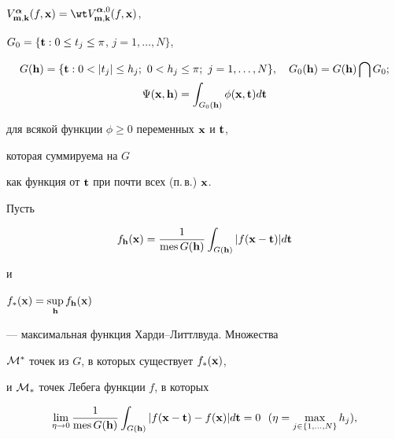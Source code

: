 $V_{{\bold m},{\bold k}}^{\boldsymbol{\alpha}}(f,{\bold x})


=\wt V_{{\bold m},{\bold k}}^{{\boldsymbol{\alpha}},0}(f,{\bold x})$,


$G_0=\{{\bold t}: 0\le t_j\le \pi$, $j=1,\dotsc,N\}$,


\begin{gather*}


G({\bold h})=\{{\bold t}: 0< |t_j|\le h_j;\ 0<h_j\le \pi;\ j=1,\dotsc,N\},


\quad G_{0}({\bold h})=G({\bold h})\bigcap G_0;\\


%


\Psi({\bold x},{\bold h})=\int_{G_0({\bold h})}


\phi ({\bold x},{\bold t})d{\bold t} 


\end{gather*}


для всякой функции $\phi\ge 0$ переменных ${\bold x}$ и ${\bold t}$,


которая суммируема на $G$


как функция от ${\bold t}$ при почти всех (п.\,в.) ${\bold x}$.





Пусть 


\begin{equation}


f_{\bold h}({\bold x})=\frac{1}{\mes G({\bold h})}


\int_{G({\bold h})}| f ({\bold x}-{\bold t})|d{\bold t}


\end{equation}


и


$f_{*}({\bold x})=\sup\limits_{\bold h} f_{\bold h}({\bold x})$


--- максимальная функция Харди--Литтлвуда. Множества 


${\cal M}^*$ точек из $G$, в которых существует $f_{*}({\bold x})$,


и ${\cal M}_*$ точек Лебега функции $f$, в которых


\begin{equation*}


\lim_{\eta \to 0} \frac{1}{\mes G({\bold h})}


\int_{G({\bold h})}| f ({\bold x}-{\bold t}) - f ({\bold x})|d{\bold t}=0


\ \ (\eta=\max_{j\in \{1,\dotsc,N\}} h_j),


\end{equation*}


